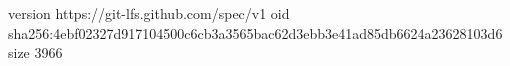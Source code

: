 version https://git-lfs.github.com/spec/v1
oid sha256:4ebf02327d917104500c6cb3a3565bac62d3ebb3e41ad85db6624a23628103d6
size 3966
